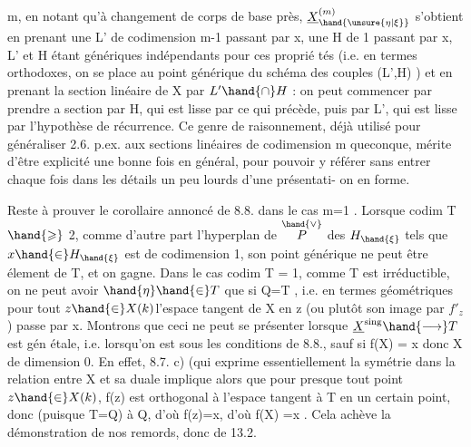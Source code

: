 
\margin{|}m, en notant qu'à changement de corps de base près, $\underline{X}^{(m)}_{\hand{\unsure{\eta|\xi}}}$ s'obtient en
prenant une L' de codimension m-1 passant par x, une H de 
1 passant par x, L' et H étant génériques indépendants pour ces proprié
tés (i.e. en termes orthodoxes, on se place au point générique du 
schéma des couples (L',H)  ) et en prenant la section linéaire
de X par $L'\hand{\cap} H$ : on peut commencer par prendre a section par H, qui
est lisse par ce qui précède, puis par L', qui est lisse par l'hypothèse
de récurrence. Ce genre de raisonnement, déjà utilisé pour généraliser
2.6. p.ex. aux sections linéaires de codimension m queconque, mérite
d'être explicité une bonne fois en général, pour pouvoir y référer sans
entrer  chaque fois dans les détails un peu lourds d'une présentati-%
on en forme.

Reste à prouver le corollaire annoncé de 8.8. dans le cas m=1 .
Lorsque  codim T $\hand{\geqslant}$ 2, comme d'autre part l'hyperplan  de $\overset{\hand{\vee}}{P}$ des
$H_{\hand{\xi}}$ tels que $x\hand{\in} H_{\hand{\xi}}$ est de codimension 1, son point générique \inserted{$\eta$} ne peut
être élement de T, et on gagne. Dans le cas codim T = 1, comme T est
irréductible, on ne peut avoir $\hand{\eta}\hand{\in} T$ que si Q=T ,
i.e. en termes géométriques   pour tout $z\hand{\in} X(k)$l'espace tangent
de X en z (ou plutôt son image par $f'_{z}$ ) passe par x. Montrons que
ceci ne peut se présenter lorsque $\underline{X}^{\mathrm{sing}}\hand{\longrightarrow}T$ est gén étale, i.e.
lorsqu'on est sous les conditions de 8.8., sauf si f(X) = \hand{\{}x\hand{\}} donc X
de dimension 0. En effet, 8.7. c) (qui exprime essentiellement la
symétrie  dans la relation entre X et sa duale \hand{)} implique alors que
pour presque tout point $z\hand{\in} X(k)$, f(z) est orthogonal à l'espace tangent
à T en un certain point, donc (puisque T=Q)  à Q, d'où f(z)=x, d'où
f(X) =\hand{\{}x\hand{\}} . Cela achève la démonstration de nos remords, donc de 13.2.

